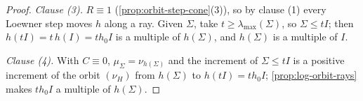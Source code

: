 \begin{proof}
\emph{Clause (3).} $R \equiv 1$ (\ref{prop:orbit-step-cone}(3)), so by clause (1) every Loewner step
moves $h$ along a ray. Given $\Sigma$, take $t \ge \lambda_{\max}(\Sigma)$, so $\Sigma \le tI$; then
$h(tI) = t\,h(I) = th_0I$ is a multiple of $h(\Sigma)$, and $h(\Sigma)$ is a multiple of $I$.

\emph{Clause (4).} With $C \equiv 0$, $\mu_\Sigma = \nu_{h(\Sigma)}$ and the increment of
$\Sigma \le tI$ is a positive increment of the orbit $(\nu_H)$ from $h(\Sigma)$ to $h(tI) = th_0I$;
\ref{prop:log-orbit-rays} makes $th_0I$ a multiple of $h(\Sigma)$.
\end{proof}

